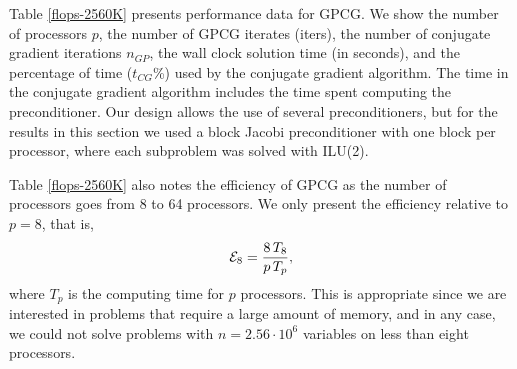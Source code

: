 \documentclass{esub2acm}
\begin{document}
Table \ref{flops-2560K} presents performance data for
GPCG.
We show the number
of processors $p$,
the number of GPCG iterates (iters), the number of
conjugate gradient iterations $ n_{GP} $,
the wall clock solution time (in seconds),
and the percentage of time ($t_{CG}$\%) used by the conjugate
gradient algorithm.
The time in the conjugate gradient algorithm
includes the time spent
computing the preconditioner.
Our design allows the use of several preconditioners, but for the
results in this section we used a block Jacobi preconditioner
with one block per processor, where each subproblem was solved
with ILU(2).

Table \ref{flops-2560K} also notes the
efficiency of GPCG as the number of processors 
goes from 8 to 64 processors. We only present the
efficiency relative to $ p = 8 $, that is,
\[
{\cal E}_{8} = \frac {8 \, T_8} {p \, T_p} ,
\]
where $ T_p $ is the computing time for $p$ processors.
This is appropriate since we are interested in problems
that require a large amount of memory, and in any case,
we could not solve problems with $ n = 2.56 \cdot 10^6 $ variables
on less than eight processors.
\end{document}
